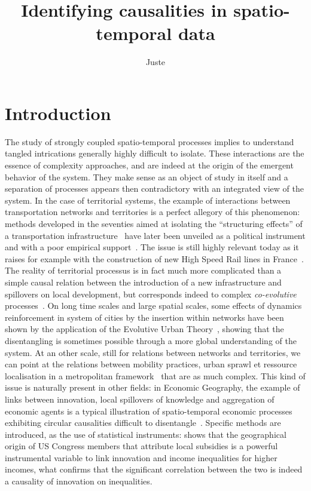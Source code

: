 \documentclass[english]{./sageo}
\title[Spatio-temporal Causalities]{Identifying causalities in spatio-temporal data}
\author[1,2]{Juste}{Raimbault}
\begin{document}
\maketitle




\section{Introduction}


The study of strongly coupled spatio-temporal processes implies to understand tangled intrications generally highly difficult to isolate. These interactions are the essence of complexity approaches, and are indeed at the origin of the emergent behavior of the system. They make sense as an object of study in itself and a separation of processes appears then contradictory with an integrated view of the system. In the case of territorial systems, the example of interactions between transportation networks and territories is a perfect allegory of this phenomenon: methods developed in the seventies aimed at isolating the ``structuring effects'' of a transportation infrastructure~\cite{bonnafous1974methodologies} have later been unveiled as a political instrument and with a poor empirical support~\cite{offner1993effets}. The issue is still highly relevant today as it raises for example with the construction of new High Speed Rail lines in France~\cite{crozethalshs01094554}. The reality of territorial processus is in fact much more complicated than a simple causal relation between the introduction of a new infrastructure and spillovers on local development, but corresponds indeed to complex \emph{co-evolutive} processes~\cite{bretagnolletel00459720}. On long time scales and large spatial scales, some effects of dynamics reinforcement in system of cities by the insertion within networks have been shown by the application of the Evolutive Urban Theory~\cite{espacegeo2014effets}, showing that the disentangling is sometimes possible through a more global understanding of the system. At an other scale, still for relations between networks and territories, we can point at the relations between mobility practices, urban sprawl et ressource localisation in a metropolitan framework~\cite{cerqueira2017inegalites} that are as much complex. This kind of issue is naturally present in other fields: in Economic Geography, the example of links between innovation, local spillovers of knowledge and aggregation of economic agents is a typical illustration of spatio-temporal economic processes exhibiting circular causalities difficult to disentangle~\cite{audretsch1996r}. Specific methods are introduced, as the use of statistical instruments: \cite{aghion2015innovation} shows that the geographical origin of US Congress members that attribute local subsidies is a powerful instrumental variable to link innovation and income inequalities for higher incomes, what confirms that the significant correlation between the two is indeed a causality of innovation on inequalities.
\end{document}
